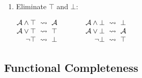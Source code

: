 \documentclass[a4paper,10pt]{article}
\begin{document}
\begin{enumerate}[topsep=2pt, itemsep=2pt]
    \item Eliminate $\top$ and $\bot$:
    \par\(\openup-\jot\begin{aligned}[t]
        \mathcal{A} \land \top &~\rightsquigarrow~ \mathcal{A} &\qquad&&
        \mathcal{A} \land \bot &~\rightsquigarrow~ \bot \\
        \mathcal{A} \lor \top &~\rightsquigarrow~ \top &\qquad&&
        \mathcal{A} \lor \bot &~\rightsquigarrow~ \mathcal{A} \\
        \neg\top &~\rightsquigarrow~ \bot &\qquad&&
        \neg\bot &~\rightsquigarrow~ \top
    \end{aligned}\)
\end{enumerate}


\newpage
\subsection{Functional Completeness%
\texorpdfstring{\normalsize\protect{}}{}}
\end{document}
